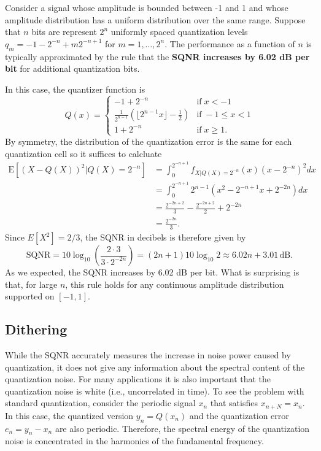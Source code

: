 \begin{example}
Consider a signal whose amplitude is bounded between -1 and 1 and whose amplitude distribution has a uniform distribution over the same range.
Suppose that $n$ bits are represent $2^n$ uniformly spaced quantization levels $q_m = -1-2^{-n} + m 2^{-n+1}$ for $m=1,\ldots,2^n$.
The performance as a function of $n$ is typically approximated by the rule that the \textbf{SQNR increases by 6.02 dB per bit} for additional quantization bits.

In this case, the quantizer function is
\[ Q(x) =
\begin{cases}
-1+2^{-n} & \mathrm{if} \; x < -1 \\
\frac{1}{2^{n-1}} \left( \lfloor 2^{n-1} x \rfloor - \frac{1}{2} \right) & \mathrm{if} \; - 1 \leq x < 1 \\
1+2^{-n} & \mathrm{if} \; x \geq 1.
\end{cases}
\]
By symmetry, the distribution of the quantization error is the same for each quantization cell so it suffices to calcluate
\begin{align*}
\mathrm{E} \left[ \left( X - Q(X) \right)^2 \big| Q(X)=2^{-n} \right]
&= \int_{0}^{2^{-n+1}} f_{X|Q(X)=2^{-n}}(x) (x-2^{-n})^2 dx \\
&= \int_{0}^{2^{-n+1}} 2^{n-1} (x^2-2^{-n+1}x+2^{-2n}) dx \\
&= \frac{2^{-2n+2}}{3} - \frac{2^{-2n+2}}{2} + 2^{-2n} \\
&= \frac{2^{-2n}}{3}.
\end{align*}
Since $E[X^2] = 2/3$, the SQNR in decibels is therefore given by
\[ \text{SQNR} = 10 \log_{10} \left( \frac{2\cdot 3}{3\cdot 2^{-2n}} \right)  = (2n+1) 10 \log_{10} 2 \approx 6.02 n + 3.01 \, \text{dB}. \]
As we expected, the SQNR increases by 6.02 dB per bit.
What is surprising is that, for large $n$,  this rule holds for any continuous amplitude distribution supported on $[-1,1]$.
\end{example}

\subsection{Dithering}

While the SQNR accurately measures the increase in noise power caused by quantization, it does not give any information about the spectral content of the quantization noise.
For many applications it is also important that the quantization noise is white (i.e., uncorrelated in time).
To see the problem with standard quantization, consider the periodic signal $x_n$ that satisfies $x_{n+N} = x_n$.
In this case, the quantized version $y_n = Q(x_n)$ and the quantization error $e_n = y_n - x_n$ are also periodic.
Therefore, the spectral energy of the quantization noise is concentrated in the harmonics of the fundamental frequency.

